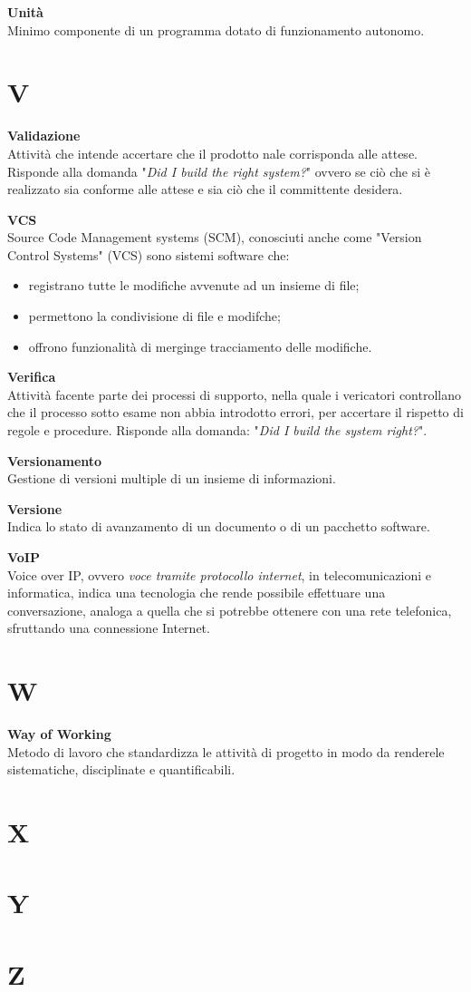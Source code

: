 \documentclass[a4paper, oneside, openany, dvipsnames, table, 12pt]{article}
\begin{document}
\textbf{Unità} \\
Minimo componente di un programma dotato di funzionamento autonomo.


\newpage
\section{V}
\textbf{Validazione} \\
Attività che intende accertare che il prodotto nale corrisponda alle attese. Risponde alla domanda "\textit{Did I build the right system?}" ovvero se ciò che si è realizzato sia conforme alle attese e sia ciò che il committente desidera.

\textbf{VCS} \\
Source Code Management systems (SCM), conosciuti anche come "Version Control Systems" (VCS) sono sistemi software che: \begin{itemize}
\item registrano tutte le modifiche avvenute ad un insieme di file;
\item permettono la condivisione di file e modifche;
\item offrono funzionalità di merging\glo e tracciamento delle modifiche.
\end{itemize}

\textbf{Verifica} \\
Attività facente parte dei processi di supporto, nella quale i vericatori controllano che il processo sotto esame non abbia introdotto errori, per accertare il rispetto di regole e procedure. Risponde alla domanda: "\textit{Did I build the system right?}".

\textbf{Versionamento} \\
Gestione di versioni multiple di un insieme di informazioni.

\textbf{Versione} \\
Indica lo stato di avanzamento di un documento o di un pacchetto software.

\textbf{VoIP} \\
Voice over IP, ovvero \textit{voce tramite protocollo internet}, in telecomunicazioni e informatica, indica una tecnologia che rende possibile effettuare una conversazione, analoga a quella che si potrebbe ottenere con una rete telefonica, sfruttando una connessione Internet.

\newpage
\section{W}
\textbf{Way of Working} \\
Metodo di lavoro che standardizza le attività di progetto in modo da renderele sistematiche, disciplinate e quantificabili.

\newpage
\section{X}

\newpage
\section{Y}

\newpage
\section{Z}
\end{document}
